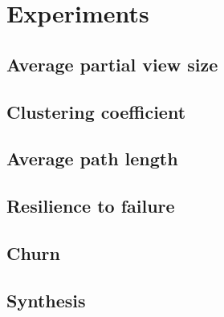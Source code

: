 
\section{Experiments}
\label{sec:experiments}

\subsection{Average partial view size}

\subsection{Clustering coefficient}

\subsection{Average path length}

\subsection{Resilience to failure}

\subsection{Churn}

\subsection{Synthesis}

